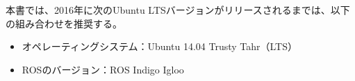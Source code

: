 本書では、2016年に次のUbuntu LTSバージョンがリリースされるまでは、以下の組み合わせを推奨する。

\begin{itemize}
\item オペレーティングシステム：Ubuntu 14.04 Trusty Tahr（LTS）
\item ROSのバージョン：ROS Indigo Igloo
\end{itemize}



